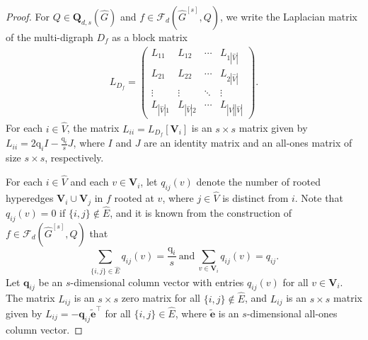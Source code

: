 \documentclass{article}
\begin{document}
\begin{proof}
For $Q \in \mathbf{Q}_{d,s}(\widehat{G})$ and $f \in \mathcal{F}_{d}(\widehat{G}^{[s]},Q)$,
we write the Laplacian matrix of the multi-digraph $D_f$ as a block matrix
\begin{align*}
L_{D_f}=
\begin{pmatrix} L_{11} & L_{12} & \cdots & L_{1|\widehat{V}|} \\ L_{21} & L_{22} & \cdots & L_{2|\widehat{V}|} \\ \vdots & \vdots & \ddots & \vdots \\ L_{|\widehat{V}|1} & L_{|\widehat{V}|2} & \cdots & L_{|\widehat{V}||\widehat{V}|}
\end{pmatrix}.
\end{align*}
For each $i \in \widehat{V}$,
the matrix $L_{ii}=L_{D_f}[\mathbf{V}_{i}]$ is an $s \times s$ matrix given by $L_{ii}=2\mathrm{q}_{i}I-\frac{\mathrm{q}_{i}}{s}J$,
where $I$ and $J$ are an identity matrix and an all-ones matrix of size $s \times s$, respectively.

For each $i \in \widehat{V}$ and each $v \in \mathbf{V}_{i}$,
let $q_{ij}(v)$ denote the number of rooted hyperedges $\mathbf{V}_{i} \cup \mathbf{V}_{j}$ in $f$ rooted at $v$,
where $j \in \widehat{V}$ is distinct from $i$.
Note that $q_{ij}(v)=0$ if $\{i,j\} \notin \widehat{E}$,
and it is known from the construction of $f \in \mathcal{F}_{d}(\widehat{G}^{[s]},Q)$ that $$\sum_{\{i,j\} \in \widehat{E}}q_{ij}(v)=\frac{\mathrm{q}_{i}}{s}\ \mbox{and}\ \sum_{v \in \mathbf{V}_{i}}q_{ij}(v)=q_{ij}.$$
Let $\mathbf{q}_{ij}$ be an $s$-dimensional column vector with entries $q_{ij}(v)$ for all $v \in \mathbf{V}_{i}$.
The matrix $L_{ij}$ is an $s \times s$ zero matrix for all $\{i,j\} \notin \widehat{E}$,
and $L_{ij}$ is an $s \times s$ matrix given by $L_{ij}=-\mathbf{q}_{ij}\mathbf{\widetilde{e}}^{\top}$ for all $\{i,j\} \in \widehat{E}$,
where $\mathbf{\widetilde{e}}$ is an $s$-dimensional all-ones column vector.


\end{proof}
\end{document}
